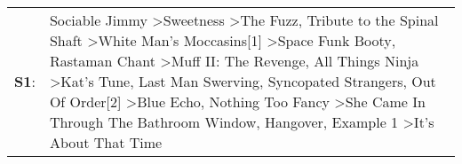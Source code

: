\begin{supertabular}{p{0.03\textwidth}p{0.92\textwidth}}
 \textbf{S1}:  &  Sociable Jimmy\textsuperscript{} \textgreater \enspace Sweetness\textsuperscript{} \textgreater \enspace The Fuzz\textsuperscript{}, \enspace Tribute to the Spinal Shaft\textsuperscript{} \textgreater \enspace White Man's Moccasins[1]\textsuperscript{} \textgreater \enspace Space Funk Booty\textsuperscript{}, \enspace Rastaman Chant\textsuperscript{} \textgreater \enspace Muff II: The Revenge\textsuperscript{}, \enspace All Things Ninja\textsuperscript{} \textgreater \enspace Kat's Tune\textsuperscript{}, \enspace Last Man Swerving\textsuperscript{}, \enspace Syncopated Strangers\textsuperscript{}, \enspace Out Of Order[2]\textsuperscript{} \textgreater \enspace Blue Echo\textsuperscript{}, \enspace Nothing Too Fancy\textsuperscript{} \textgreater \enspace She Came In Through The Bathroom Window\textsuperscript{}, \enspace Hangover\textsuperscript{}, \enspace Example 1\textsuperscript{} \textgreater \enspace It's About That Time\textsuperscript{}  \enspace  \\
\end{supertabular}
